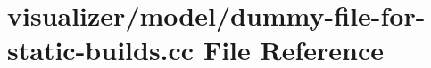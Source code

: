 \hypertarget{dummy-file-for-static-builds_8cc}{}\section{visualizer/model/dummy-\/file-\/for-\/static-\/builds.cc File Reference}
\label{dummy-file-for-static-builds_8cc}
